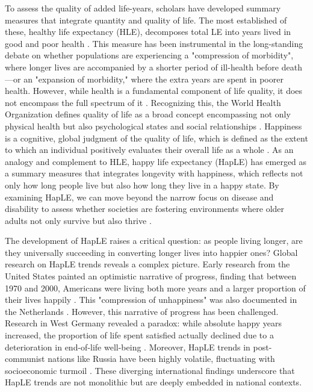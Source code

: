 \documentclass[12pt, a4paper]{article}
\begin{document}
To assess the quality of added life-years, scholars have developed summary measures that integrate quantity and quality of life. The most established of these, healthy life expectancy (HLE), decomposes total LE into years lived in good and poor health \autocite{sanders.1964.measuring}. This measure has been instrumental in the long-standing debate on whether populations are experiencing a "compression of morbidity", where longer lives are accompanied by a shorter period of ill-health before death \autocite{fries.1980.aging}—or an "expansion of morbidity," where the extra years are spent in poorer health\autocite{gruenberg.1977.failures}. However, while health is a fundamental component of life quality, it does not encompass the full spectrum of it \autocite{yang.2008.long}. Recognizing this, the World Health Organization defines quality of life as a broad concept encompassing not only physical health but also psychological states and social relationships \autocite{thewhoqolgroup.1998.development}. Happiness is a cognitive, global judgment of the quality of life, which is defined as the extent to which an individual positively evaluates their overall life as a whole \autocite{veenhoven.1996.study}. As an analogy and complement to HLE, happy life expectancy (HapLE) has emerged as a summary measures that integrates longevity with happiness, which reflects not only how long people live but also how long they live in a happy state. By examining HapLE, we can move beyond the narrow focus on disease and disability to assess whether societies are fostering environments where older adults not only survive but also thrive \autocite{yang.2008.long}.

The development of HapLE raises a critical question: as people living longer, are they universally succeeding in converting longer lives into happier ones? Global research on HapLE trends reveals a complex picture. Early research from the United States painted an optimistic narrative of progress, finding that between 1970 and 2000, Americans were living both more years and a larger proportion of their lives happily \autocite{yang.2008.long,yang.2010.increment}. This "compression of unhappiness" was also documented in the Netherlands \autocite{perenboom.2004.trends}. However, this narrative of progress has been challenged. Research in West Germany revealed a paradox: while absolute happy years increased, the proportion of life spent satisfied actually declined due to a deterioration in end-of-life well-being \autocite{nemitz.2022.increasing}. Moreover, HapLE trends in post-communist nations like Russia have been highly volatile, fluctuating with socioeconomic turmoil \autocite{minagawa.2022.trends}. These diverging international findings underscore that HapLE trends are not monolithic but are deeply embedded in national contexts.
\end{document}

